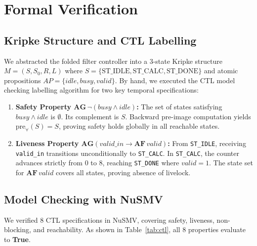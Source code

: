 \documentclass[11pt,a4paper]{article}
\begin{document}
\section{Formal Verification}
\label{sec:formal}

\subsection{Kripke Structure and CTL Labelling}
We abstracted the folded filter controller into a 3-state Kripke structure $M = (S, S_0, R, L)$ where $S = \{\text{ST\_IDLE}, \text{ST\_CALC}, \text{ST\_DONE}\}$ and atomic propositions $AP = \{\mathit{idle}, \mathit{busy}, \mathit{valid}\}$. By hand, we executed the CTL model checking labelling algorithm for two key temporal specifications:
\begin{enumerate}
  \item \textbf{Safety Property $\mathbf{AG}\,\neg(\mathit{busy} \land \mathit{idle})$:} The set of states satisfying $\mathit{busy} \land \mathit{idle}$ is $\emptyset$. Its complement is $S$. Backward pre-image computation yields $\text{pre}_{\forall}(S) = S$, proving safety holds globally in all reachable states.
  \item \textbf{Liveness Property $\mathbf{AG}(\mathit{valid\_in} \rightarrow \mathbf{AF}\,\mathit{valid})$:} From \texttt{ST\_IDLE}, receiving \texttt{valid\_in} transitions unconditionally to \texttt{ST\_CALC}. In \texttt{ST\_CALC}, the counter advances strictly from 0 to 8, reaching \texttt{ST\_DONE} where $\mathit{valid} = 1$. The state set for $\mathbf{AF}\,\mathit{valid}$ covers all states, proving absence of livelock.
\end{enumerate}

\subsection{Model Checking with NuSMV}
We verified 8 CTL specifications in NuSMV, covering safety, liveness, non-blocking, and reachability. As shown in Table~\ref{tab:ctl}, all 8 properties evaluate to \textbf{True}.
\end{document}

